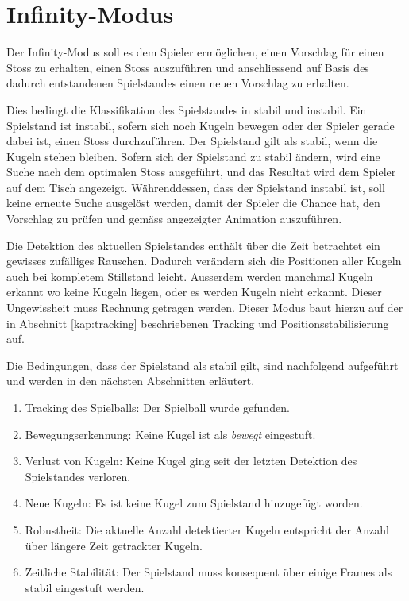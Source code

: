 \section{Infinity-Modus}
Der Infinity-Modus soll es dem Spieler ermöglichen, einen Vorschlag für einen Stoss zu erhalten,
einen Stoss auszuführen und anschliessend auf Basis des dadurch entstandenen Spielstandes einen neuen Vorschlag zu erhalten.

Dies bedingt die Klassifikation des Spielstandes in stabil und instabil. Ein Spielstand ist instabil, sofern sich noch Kugeln
bewegen oder der Spieler gerade dabei ist, einen Stoss durchzuführen. Der Spielstand gilt als stabil, wenn die Kugeln
stehen bleiben. Sofern sich der Spielstand zu stabil ändern, wird eine Suche nach dem optimalen Stoss ausgeführt,
und das Resultat wird dem Spieler auf dem Tisch angezeigt. Währenddessen, dass der Spielstand instabil ist, soll keine erneute
Suche ausgelöst werden, damit der Spieler die Chance hat, den Vorschlag zu prüfen und gemäss angezeigter Animation auszuführen.

Die Detektion des aktuellen Spielstandes enthält über die Zeit betrachtet ein gewisses zufälliges Rauschen.
Dadurch verändern sich die Positionen aller Kugeln auch bei kompletem Stillstand leicht.
Ausserdem werden manchmal Kugeln erkannt wo keine Kugeln liegen, oder es werden Kugeln nicht erkannt.
Dieser Ungewissheit muss Rechnung getragen werden.
Dieser Modus baut hierzu auf der in Abschnitt \ref{kap:tracking} beschriebenen Tracking und Positionsstabilisierung auf.

Die Bedingungen, dass der Spielstand als stabil gilt, sind nachfolgend aufgeführt und werden in den nächsten Abschnitten erläutert.
\begin{enumerate}
    \item Tracking des Spielballs: Der Spielball wurde gefunden.
    \item Bewegungserkennung: Keine Kugel ist als \emph{bewegt} eingestuft.
    \item Verlust von Kugeln: Keine Kugel ging seit der letzten Detektion des Spielstandes verloren.
    \item Neue Kugeln: Es ist keine Kugel zum Spielstand hinzugefügt worden.
    \item Robustheit: Die aktuelle Anzahl detektierter Kugeln entspricht der Anzahl über längere Zeit getrackter Kugeln.
    \item Zeitliche Stabilität: Der Spielstand muss konsequent über einige Frames als stabil eingestuft werden.
\end{enumerate}

